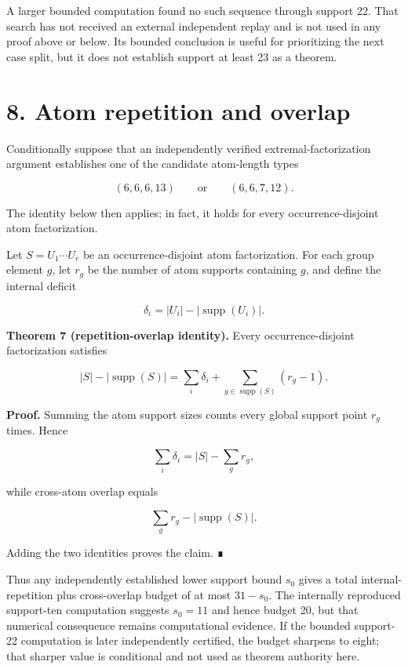 \documentclass[
  11pt,
]{article}
\begin{document}
A larger bounded computation found no such sequence through support 22.
That search has not received an external independent replay and is not
used in any proof above or below. Its bounded conclusion is useful for
prioritizing the next case split, but it does not establish support at
least 23 as a theorem.

\hypertarget{atom-repetition-and-overlap}{%
\section{8. Atom repetition and
overlap}\label{atom-repetition-and-overlap}}

Conditionally suppose that an independently verified
extremal-factorization argument establishes one of the candidate
atom-length types

\[
(6,6,6,13)
\qquad\text{or}\qquad
(6,6,7,12).
\]

The identity below then applies; in fact, it holds for every
occurrence-disjoint atom factorization.

Let \(S=U_1\cdots U_r\) be an occurrence-disjoint atom factorization.
For each group element \(g\), let \(r_g\) be the number of atom supports
containing \(g\), and define the internal deficit

\[
\delta_i=|U_i|-|\operatorname{supp}(U_i)|.
\]

\textbf{Theorem 7 (repetition-overlap identity).} Every
occurrence-disjoint factorization satisfies

\[
|S|-|\operatorname{supp}(S)|
=\sum_i\delta_i
+\sum_{g\in\operatorname{supp}(S)}(r_g-1).
\]

\textbf{Proof.} Summing the atom support sizes counts every global
support point \(r_g\) times. Hence

\[
\sum_i\delta_i=|S|-\sum_g r_g,
\]

while cross-atom overlap equals

\[
\sum_g r_g-|\operatorname{supp}(S)|.
\]

Adding the two identities proves the claim. ∎

Thus any independently established lower support bound \(s_0\) gives a
total internal-repetition plus cross-overlap budget of at most
\(31-s_0\). The internally reproduced support-ten computation suggests
\(s_0=11\) and hence budget 20, but that numerical consequence remains
computational evidence. If the bounded support-22 computation is later
independently certified, the budget sharpens to eight; that sharper
value is conditional and not used as theorem authority here.
\end{document}
